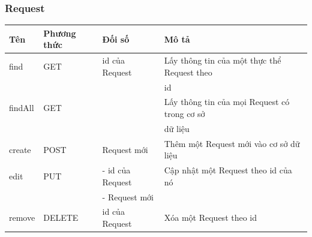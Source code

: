 \documentclass[a4paper]{article}
\begin{document}
\subsubsection*{Request}
    \begin{center}
        \begin{table}[h]
            \begin{tabular}{|l|l|l|m{7.2cm}|}
            \hline
            \rowcolor[HTML]{C0C0C0} 
            \textbf{Tên} & \textbf{Phương thức} & \textbf{Đối số} & \textbf{Mô tả}\\
            \hline
            find & GET & id của Request & Lấy thông tin của một thực thể Request theo \\
            	&&&id\\ 
            \hline
            findAll & GET &   & Lấy thông tin của mọi Request có trong cơ sở \\
            &&&dữ liệu\\
            \hline
            create & POST & Request mới  & Thêm một Request mới vào cơ sở dữ liệu\\          
            \hline
            edit & PUT & - id của Request  & Cập nhật một Request theo id của nó\\
            && - Request mới & \\
            \hline        
            remove & DELETE & id của Request  & Xóa một Request theo id\\            
            \hline                    
            \end{tabular}
        \end{table}    
    \end{center}
\end{document}
